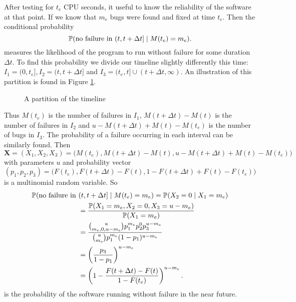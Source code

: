 After testing for $t_e$ CPU seconds, it useful to know the reliability of the software at that point. If we know that $m_e$ bugs were found and fixed at time $t_e$. Then the conditional probability
$$
    \mathbb{P}(\text{no failure in } (t, t+ \Delta t]\mid M(t_e)=m_e). 
$$
measures the likelihood of the program to run without failure for some duration $\Delta t$. To find this probability we divide our timeline slightly differently this time: $I_1=(0,t_e], I_2=(t, t+\Delta t]$ and $I_3=(t_e,t]\cup(t+\Delta t, \infty)$. An illustration of this partition is found in Figure \ref{fig:partition}.
\begin{figure}
    \centering
    \caption{A partition of the timeline}
    \label{fig:partition}
\end{figure}
Thus $M(t_e)$ is the number of failures in $I_1$, $M(t+\Delta t)-M(t)$ is the number of failures in $I_2$ and $u-M(t+\Delta t) + M(t)-M(t_e)$ is the number of bugs in $I_3$. The probability of a failure occurring in each interval can be similarly found. Then
$$\mathbf{X}=(X_1,X_2,X_3)=\big(M(t_e), M(t+\Delta t)-M(t), u-M(t+\Delta t)+M(t)-M(t_e)\big)$$ 
with parameters $u$ and probability vector
$$(p_1, p_2, p_3)=\big(F(t_e), F(t+\Delta t)-F(t), 1-F(t+\Delta t)+F(t)-F(t_e)\big)$$ 
is a multinomial random variable. So
\begin{equation}\label{eq:prob-no-fail}
    \begin{aligned}
    \mathbb{P}(\text{no failure in } &(t, t+\Delta t] \; | \; M(t_e) = m_e) = \mathbb{P}(X_2 = 0 \;|\; X_1 = m_e)\\
    &= \frac{\mathbb{P}(X_1 = m_e, X_2=0, X_3=u-m_e)}{\mathbb{P}(X_1 =m_e)}\\
    &=\frac{{u\choose m_e,0, u-m_e}p_1^{m_e}p_2^0 p_3^{u-m_e}}{{u\choose m_e} p_1^{m_e}(1-p_1)^{u-m_e}}\\
    &=\left(\frac{p_3}{1-p_1}\right)^{u-m_e}\\
    &=\left(1 - \frac{F(t+\Delta t) - F(t)}{1 - F(t_e)}\right)^{u-m_e}.
\end{aligned}
\end{equation}
is the probability of the software running without failure in the near future. 

